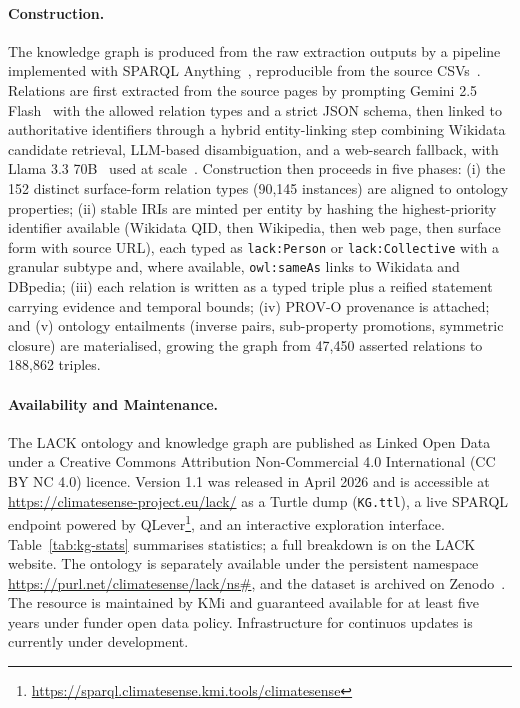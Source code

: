\paragraph{Construction.}
The knowledge graph is produced from the raw extraction outputs by a pipeline implemented with SPARQL Anything~\cite{asprino2023knowledge}, reproducible from the source CSVs~\cite{lack-kgc}.
Relations are first extracted from the source pages by prompting Gemini 2.5 Flash~\cite{gemini25} with the allowed relation types and a strict JSON schema, then linked to authoritative identifiers through a hybrid entity-linking step combining Wikidata candidate retrieval, LLM-based disambiguation, and a web-search fallback, with Llama 3.3 70B~\cite{llama33} used at scale~\cite{lack-re,lack-el}.
Construction then proceeds in five phases: (i) the 152 distinct surface-form relation types (90,145 instances) are aligned to ontology properties; (ii) stable IRIs are minted per entity by hashing the highest-priority identifier available (Wikidata QID, then Wikipedia, then web page, then surface form with source URL), each typed as \texttt{lack:Person} or \texttt{lack:Collective} with a granular subtype and, where available, \texttt{owl:sameAs} links to Wikidata and DBpedia; (iii) each relation is written as a typed triple plus a reified statement carrying evidence and temporal bounds; (iv) PROV-O provenance is attached; and (v) ontology entailments (inverse pairs, sub-property promotions, symmetric closure) are materialised, growing the graph from 47,450 asserted relations to 188,862 triples.

\vspace{-0.3cm}\paragraph{Availability and Maintenance.}
The LACK ontology and knowledge graph are published as Linked Open Data under a Creative Commons Attribution Non-Commercial 4.0 International (CC BY NC 4.0) licence.
Version 1.1 was released in April 2026 and is accessible at \url{https://climatesense-project.eu/lack/} as a Turtle dump (\texttt{KG.ttl}), a live SPARQL endpoint powered by QLever\footnote{\url{https://sparql.climatesense.kmi.tools/climatesense}}, and an interactive exploration interface.
Table~\ref{tab:kg-stats} summarises statistics; a full breakdown is on the LACK website.
The ontology is separately available under the persistent namespace \url{https://purl.net/climatesense/lack/ns#}, and the dataset is archived on Zenodo~\cite{lack}.
The resource is maintained by KMi and guaranteed available for at least five years under funder open data policy. 
Infrastructure for continuos updates is currently under development.

